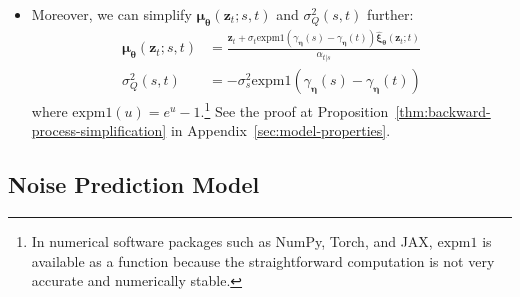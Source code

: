\documentclass[10pt]{article}
\newcommand{\ve}[1]{\mathbf{#1}}
\newcommand{\ves}[1]{\boldsymbol{#1}}
\newcommand{\mrm}[1]{\mathrm{#1}}
\begin{document}
\begin{itemize}
  \item Moreover, we can simplify $\ves{\mu}_{\ves{\theta}}(\ve{z}_t; s, t)$ and $\sigma^2_Q(s,t)$ further:
  \begin{align*}
    \ves{\mu}_{\ves{\theta}}(\ve{z}_t; s, t) 
    &= \frac{\ve{z}_t + \sigma_t \mrm{expm1}( \gamma_{\ves{\eta}}(s) - \gamma_{\ves{\eta}}(t)) \hat{\ves{\xi}}_{\ves{\theta}}(\ve{z}_t; t)}{\alpha_{t|s}} \\
    \sigma_Q^2(s,t) &= -\sigma_s^2 \mrm{expm1}(\gamma_{\ves{\eta}}(s) - \gamma_{\ves{\eta}}(t))
  \end{align*}
  where $\mrm{expm1}(u) = e^u - 1$.\footnote{In numerical software packages such as NumPy, Torch, and JAX, $\mrm{expm1}$ is available as a function because the straightforward computation is not very accurate and numerically stable.} See the proof at Proposition~\ref{thm:backward-process-simplification} in Appendix~\ref{sec:model-properties}.
\end{itemize}

\subsection{Noise Prediction Model}
\end{document}
